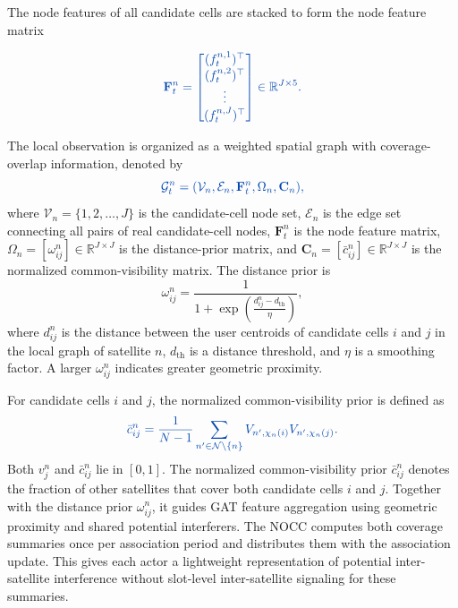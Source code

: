 \documentclass[journal]{IEEEtran}
\newcommand{\revbegin}[1]{\color{revisionblue}\ignorespaces}
\newcommand{\revend}[1]{\color{black}\ignorespaces}
\begin{document}
\revbegin{}The node features of all candidate cells are stacked to form the node feature matrix\revend{}

\begin{equation}\color{revisionblue}
\mathbf{F}_t^n=
\begin{bmatrix}
(f_t^{n,1})^\top\\
(f_t^{n,2})^\top\\
\vdots\\
(f_t^{n,J})^\top
\end{bmatrix}
\in\mathbb{R}^{J\times 5}.
\end{equation}

\revbegin{}The local observation is organized as a weighted spatial graph with coverage-overlap information, denoted by\revend{}
\begin{equation}\color{revisionblue}
\mathcal{G}_t^n=(\mathcal{V}_n,\mathcal{E}_n,\mathbf{F}_t^n,\Omega_n,\mathbf C_n),
\end{equation}
\revbegin{}where $\mathcal V_n=\{1,2,\ldots,J\}$ is the candidate-cell node set, $\mathcal E_n$ is the edge set connecting all pairs of real candidate-cell nodes, $\mathbf F_t^n$ is the node feature matrix, $\Omega_n=[\omega_{ij}^n]\in\mathbb R^{J\times J}$ is the distance-prior matrix, and $\mathbf C_n=[\bar c_{ij}^n]\in\mathbb R^{J\times J}$ is the normalized common-visibility matrix. The distance prior is\revend{}
\begin{equation}
\omega_{ij}^n=\frac{1}{1+\exp\left(\frac{d_{ij}^n-d_{\mathrm{th}}}{\eta}\right)},
\end{equation}
\revbegin{}where $d_{ij}^n$ is the distance between the user centroids of candidate cells $i$ and $j$ in the local graph of satellite $n$, $d_{\mathrm{th}}$ is a distance threshold, and $\eta$ is a smoothing factor. A larger $\omega_{ij}^n$ indicates greater geometric proximity.\revend{}

\revbegin{}For candidate cells $i$ and $j$, the normalized common-visibility prior is defined as\revend{}
\begin{equation}\color{revisionblue}
\bar c_{ij}^n=\frac{1}{N-1}\sum_{n'\in\mathcal N\setminus\{n\}}V_{n',\chi_n(i)}V_{n',\chi_n(j)}.
\label{eq:common-visibility}
\end{equation}
\revbegin{}Both $v_j^n$ and $\bar c_{ij}^n$ lie in $[0,1]$. The normalized common-visibility prior $\bar c_{ij}^n$ denotes the fraction of other satellites that cover both candidate cells $i$ and $j$. Together with the distance prior $\omega_{ij}^n$, it guides GAT feature aggregation using geometric proximity and shared potential interferers. The NOCC computes both coverage summaries once per association period and distributes them with the association update. This gives each actor a lightweight representation of potential inter-satellite interference without slot-level inter-satellite signaling for these summaries.\revend{}
\end{document}

